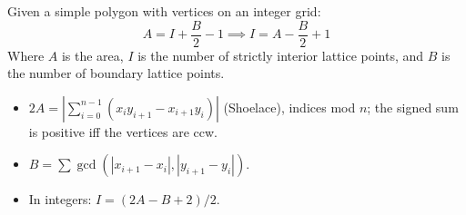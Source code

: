 Given a simple polygon with vertices on an integer grid:
$$A = I + \frac{B}{2} - 1 \implies I = A - \frac{B}{2} + 1$$
Where $A$ is the area, $I$ is the number of strictly interior lattice points, and $B$ is the number of boundary lattice points.
\begin{itemize}
    \item $2A = \left|\sum_{i=0}^{n-1} (x_i y_{i+1} - x_{i+1} y_i)\right|$ (Shoelace), indices mod $n$; the signed sum is positive iff the vertices are ccw.
    \item $B = \sum \gcd(|x_{i+1} - x_i|, |y_{i+1} - y_i|)$.
    \item In integers: $I = (2A - B + 2) / 2$.
\end{itemize}